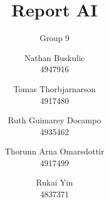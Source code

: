 \documentclass[sigconf]{acmart}
\begin{document}
\title{Report AI}
\subtitle{Group 9}


\author{Nathan Buskulic \\ 4947916}

\author{Tomas Thorbjarnarson \\ 4917480}

\author{Ruth Guimarey Docampo \\ 4935462}

\author{Thorunn Arna Omarsdottir \\ 4917499}

\author{Rukai Yin \\ 4837371}


\maketitle






 
\end{document}
